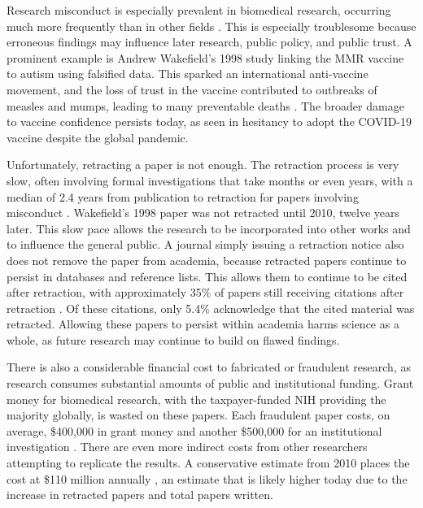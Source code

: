 \documentclass[11pt,letterpaper]{article}
\begin{document}
Research misconduct is especially prevalent in biomedical research, occurring much more frequently than in other fields \cite{citation_needed_biomedical_prevalence}. This is especially troublesome because erroneous findings may influence later research, public policy, and public trust. A prominent example is Andrew Wakefield's 1998 study linking the MMR vaccine to autism using falsified data. This sparked an international anti-vaccine movement, and the loss of trust in the vaccine contributed to outbreaks of measles and mumps, leading to many preventable deaths \cite{citation_needed_wakefield_consequences}. The broader damage to vaccine confidence persists today, as seen in hesitancy to adopt the COVID-19 vaccine despite the global pandemic.

Unfortunately, retracting a paper is not enough. The retraction process is very slow, often involving formal investigations that take months or even years, with a median of 2.4 years from publication to retraction for papers involving misconduct \cite{retraction_delay}. Wakefield's 1998 paper was not retracted until 2010, twelve years later. This slow pace allows the research to be incorporated into other works and to influence the general public. A journal simply issuing a retraction notice also does not remove the paper from academia, because retracted papers continue to persist in databases and reference lists. This allows them to continue to be cited after retraction, with approximately 35\% of papers still receiving citations after retraction \cite{post_retraction_citations}. Of these citations, only 5.4\% acknowledge that the cited material was retracted. Allowing these papers to persist within academia harms science as a whole, as future research may continue to build on flawed findings.

There is also a considerable financial cost to fabricated or fraudulent research, as research consumes substantial amounts of public and institutional funding. Grant money for biomedical research, with the taxpayer-funded NIH providing the majority globally, is wasted on these papers. Each fraudulent paper costs, on average, \$400,000 in grant money \cite{misconduct_grant_cost} and another \$500,000 for an institutional investigation \cite{misconduct_investigation_cost}. There are even more indirect costs from other researchers attempting to replicate the results. A conservative estimate from 2010 places the cost at \$110 million annually \cite{misconduct_investigation_cost}, an estimate that is likely higher today due to the increase in retracted papers and total papers written.
\end{document}
